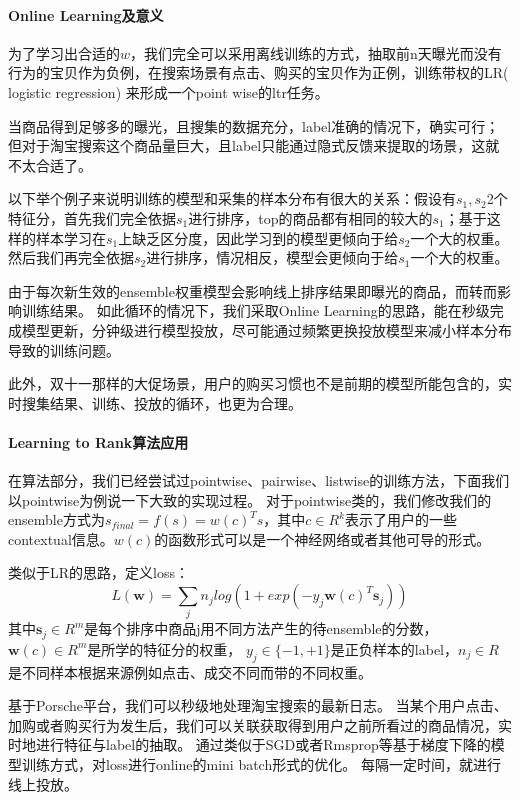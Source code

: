 \paragraph{Online Learning及意义}
为了学习出合适的$w$，我们完全可以采用离线训练的方式，抽取前n天曝光而没有行为的宝贝作为负例，在搜索场景有点击、购买的宝贝作为正例，训练带权的LR( logistic regression) 来形成一个point wise的ltr任务。

当商品得到足够多的曝光，且搜集的数据充分，label准确的情况下，确实可行；但对于淘宝搜索这个商品量巨大，且label只能通过隐式反馈来提取的场景，这就不太合适了。

以下举个例子来说明训练的模型和采集的样本分布有很大的关系：假设有$s_1, s_2$2个特征分，首先我们完全依据$s_1$进行排序，top的商品都有相同的较大的$s_1$；基于这样的样本学习在$s_1$上缺乏区分度，因此学习到的模型更倾向于给$s_2$一个大的权重。然后我们再完全依据$s_2$进行排序，情况相反，模型会更倾向于给$s_1$一个大的权重。

由于每次新生效的ensemble权重模型会影响线上排序结果即曝光的商品，而转而影响训练结果。
如此循环的情况下，我们采取Online Learning的思路，能在秒级完成模型更新，分钟级进行模型投放，尽可能通过频繁更换投放模型来减小样本分布导致的训练问题。

此外，双十一那样的大促场景，用户的购买习惯也不是前期的模型所能包含的，实时搜集结果、训练、投放的循环，也更为合理。

\paragraph{Learning to Rank算法应用}
在算法部分，我们已经尝试过pointwise、pairwise、listwise的训练方法，下面我们以pointwise为例说一下大致的实现过程。
对于pointwise类的，我们修改我们的ensemble方式为$s_{final} = f(s) = w(c)^Ts$，其中$c\in R^k$表示了用户的一些contextual信息。$w(c)$的函数形式可以是一个神经网络或者其他可导的形式。

类似于LR的思路，定义loss：
$$L(\textbf{w}) = \sum_{j} n_jlog(1+exp(-y_j\textbf{w}(c)^T\textbf{s}_j))$$
其中$\textbf{s}_j\in{R}^m$是每个排序中商品j用不同方法产生的待ensemble的分数，$\textbf{w}(c)\in{R}^m$是所学的特征分的权重，
$y_j\in\{-1,+1\}$是正负样本的label，$n_j\in{R}$是不同样本根据来源例如点击、成交不同而带的不同权重。

基于Porsche平台，我们可以秒级地处理淘宝搜索的最新日志。
当某个用户点击、加购或者购买行为发生后，我们可以关联获取得到用户之前所看过的商品情况，实时地进行特征与label的抽取。
通过类似于SGD或者Rmsprop等基于梯度下降的模型训练方式，对loss进行online的mini batch形式的优化。
每隔一定时间，就进行线上投放。

